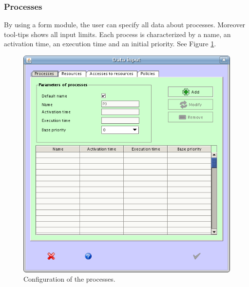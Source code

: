 \documentclass[10pt,a4paper,twoside,titlepage]{article}
\begin{document}
\subsubsection{Processes}
\label{subsubsec:Processes}
By using a form module, the user can specify all data about processes. Moreover tool-tips shows all input limits. Each process is characterized by a name, an activation time, an execution time and an initial priority. See Figure \ref{fig:config_processes}.
\begin{figure}[tb]
	\begin{center}
		\includegraphics[scale=0.6]{config_processes}
		\caption[Configuration of the processes]{Configuration of the processes.}
		\label{fig:config_processes}
	\end{center}
\end{figure}
\end{document}
